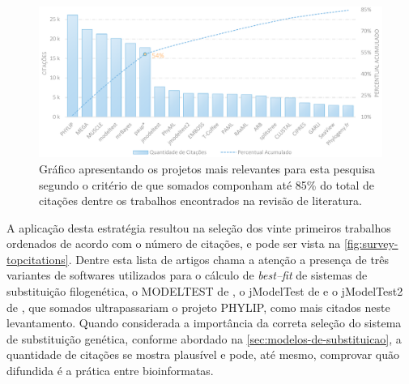 \documentclass[english,brazilian]{UNISINOSmonografia} %
\newcommand\defaultFigureWidth{0.9}
\begin{document}
\begin{figure}[tb]
\centering%
\begin{minipage}{\defaultFigureWidth\textwidth}
	\caption{Gráfico apresentando os projetos mais relevantes para esta pesquisa segundo o critério de que somados componham até 85\% do total de citações dentre os trabalhos encontrados na revisão de literatura.}
	\label{fig:survey-topcitations}
	\vspace{1ex}
	\includegraphics[width=\textwidth]{survey-topcitations}
\end{minipage}
\end{figure}


A aplicação desta estratégia resultou na seleção dos vinte primeiros trabalhos ordenados de acordo com o número de citações, e pode ser vista na \autoref{fig:survey-topcitations}.
Dentre esta lista de artigos chama a atenção a presença de três variantes de softwares utilizados para o cálculo de \textit{best--fit} de sistemas de substituição filogenética, o MODELTEST de , o jModelTest de  e o jModelTest2 de , que somados ultrapassariam o projeto PHYLIP, como mais citados neste levantamento.
Quando considerada a importância da correta seleção do sistema de substituição genética, conforme abordado na \autoref{sec:modelos-de-substituicao}, a quantidade de citações se mostra plausível e pode, até mesmo, comprovar quão difundida é a prática entre bioinformatas.
\end{document}
